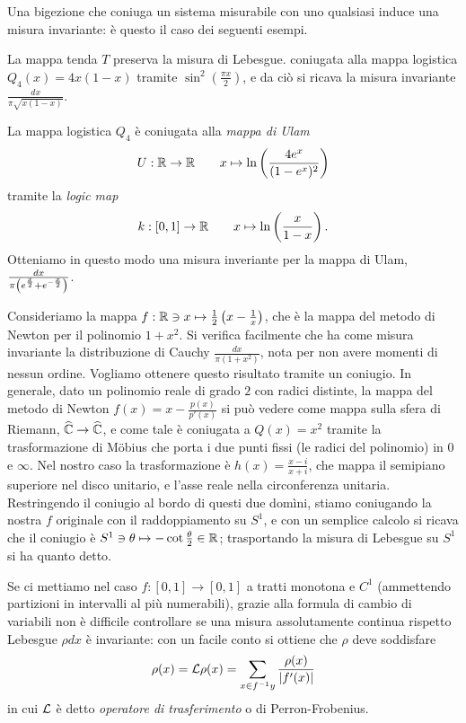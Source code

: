 Una bigezione che coniuga un sistema misurabile con uno qualsiasi induce una misura invariante: è questo il caso dei seguenti esempi.

\begin{esempio} La mappa tenda $T$ preserva la misura di Lebesgue. \Eacc coniugata alla mappa logistica $Q_4(x)=4x(1-x)$ tramite $\sin^2\left(\frac{\pi x}{2}\right)$,
 e da ciò si ricava la misura invariante $\frac{dx}{\pi\sqrt{x(1-x)}}$. 
\end{esempio}

\begin{esempio} La mappa logistica $Q_4$ è coniugata alla \emph{mappa di Ulam} 
 \[U:\mathbb{R}\rightarrow\mathbb{R} \qquad x\mapsto \ln \left(\frac{4 e^x}{(1-e^x)^2}\right)\]
tramite la \emph{logic map}
 \[k:[0,1]\rightarrow \mathbb{R} \qquad x\mapsto \ln\left(\frac{x}{1-x}\right). \]
Otteniamo in questo modo una misura inveriante per la mappa di Ulam, $\frac{dx}{\pi \left(e^{\frac{x}{2}}+e^{-\frac{x}{2}}\right)}$.
\end{esempio}

\begin{esempio} Consideriamo la mappa $f:\mathbb{R}\ni x\mapsto \frac{1}{2}\left(x-\frac{1}{x}\right)$, che è la mappa del metodo di Newton per il polinomio $1+x^2$. 
Si verifica facilmente che ha come misura invariante la distribuzione di Cauchy $\frac{dx}{\pi (1+x^2)}$, nota per non avere momenti di nessun ordine. 
Vogliamo ottenere questo risultato tramite un coniugio. 
In generale, dato un polinomio reale di grado $2$ con radici distinte, la mappa del metodo di Newton $f(x)=x-\frac{p(x)}{p'(x)}$ 
si può vedere come mappa sulla sfera di Riemann, $\widehat {\mathbb{C}}\rightarrow\widehat{\mathbb{C}}$, e come tale è coniugata a $Q(x)=x^2$ tramite la trasformazione di M\"obius che porta i due punti
fissi (le radici del polinomio) in $0$ e $\infty$. Nel nostro caso la trasformazione è $h(x)=\frac{x-i}{x+i}$, che mappa il semipiano superiore nel disco unitario, e l'asse reale
nella circonferenza unitaria. Restringendo il coniugio al bordo di questi due domìni, stiamo coniugando la nostra $f$ originale con il raddoppiamento su $S^1$, 
e con un semplice calcolo si ricava che il coniugio è $S^1\ni\theta\mapsto -\cot \frac{\theta}{2}\in\mathbb{R}$; trasportando la misura di Lebesgue su $S^1$ si ha quanto detto. 
\end{esempio}

Se ci mettiamo nel caso $f:[0,1]\rightarrow [0,1]$ a tratti monotona e $C^1$ (ammettendo partizioni in intervalli al più numerabili), grazie alla formula di cambio di variabili
non è difficile controllare se una misura assolutamente continua rispetto Lebesgue $\rho dx$ è invariante: con un facile conto si ottiene che $\rho$ deve soddisfare
\[\rho(x)=\mathcal{L}\rho(x)=\sum_{x\in f^{-1}y} \frac{\rho(x)}{|f'(x)|}\]
in cui $\mathcal{L}$ è detto \emph{operatore di trasferimento} o di Perron-Frobenius.

